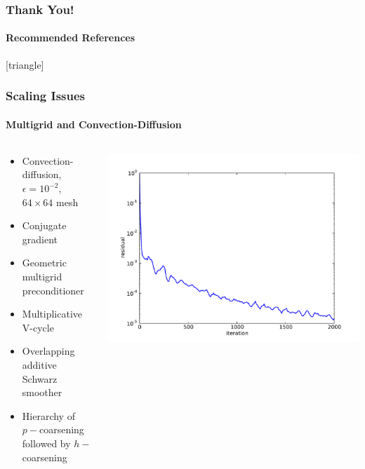 \documentclass[18pt,xcolor=table]{beamer}
\begin{document}
\begin{frame}[shrink=10]
\frametitle{Thank You!}
\framesubtitle{Recommended References}
    \nocite{DPGOverview}
    \nocite{EllisLC}
    \nocite{CamelliaDPG}
    \nocite{DemkowiczHeuer}
    \nocite{ChanHeuerThanhDemkowicz2012}
    \nocite{DPGStokes}
    \renewcommand*{\bibfont}{\small}
    [triangle]
    \printbibliography[keyword=main]
    \printbibliography[notkeyword=main]
\end{frame}

\appendix







\begin{frame}
\frametitle{Scaling Issues}
\framesubtitle{Multigrid and Convection-Diffusion}  %
\begin{columns}
\begin{column}{0.4\textwidth}
\begin{itemize}
  \item Convection-diffusion, $\epsilon=10^{-2}$, $64\times64$ mesh
  \item Conjugate gradient
  \item Geometric multigrid preconditioner
    \item Multiplicative V-cycle
    \item Overlapping additive Schwarz smoother
    \item Hierarchy of $p-$coarsening followed by $h-$coarsening
\end{itemize}
\end{column}
\begin{column}{0.6\textwidth}
\centering
\includegraphics[width=\textwidth]{Dissertation/Scaling/ConfusionResidual.pdf}
\end{column}
\end{columns}
\end{frame}
\end{document}
